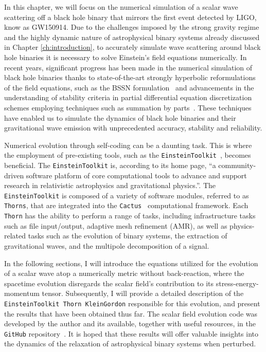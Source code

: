 In this chapter, we will focus on the numerical simulation of a scalar wave scattering off a black hole binary that mirrors the first event detected by LIGO, know as GW150914. Due to the challenges imposed by the strong gravity regime and the highly dynamic nature of astrophysical binary systems already discussed in Chapter \ref{ch:introduction}, to accurately simulate wave scattering around black hole binaries it is necessary to solve Einstein's field equations numerically. In recent years, significant progress has been made in the numerical simulation of black hole binaries thanks to state-of-the-art strongly hyperbolic reformulations of the field equations, such as the BSSN formulation~\cite{PhysRevD.52.5428,PhysRevD.59.024007} and advancements in the understanding of stability criteria in partial differential equation discretization schemes employing techniques such as summation by parts~\cite{Diener2007}. These techniques have enabled us to simulate the dynamics of black hole binaries and their gravitational wave emission with unprecedented accuracy, stability and reliability.

Numerical evolution through self-coding can be a daunting task. This is where the employment of pre-existing tools, such as the \texttt{EinsteinToolkit}~\cite{EinsteinToolkit:2022_11}, becomes beneficial. The \texttt{EinsteinToolkit} is, according to its home page, ``a community-driven software platform of core computational tools to advance and support research in relativistic astrophysics and gravitational physics.''. The \texttt{EinsteinToolkit} is composed of a variety of software modules, referred to as \texttt{Thorns}, that are integrated into the \texttt{Cactus}~\cite{Goodale:2002a} computational framework. Each \texttt{Thorn} has the ability to perform a range of tasks, including infrastructure tasks such as file input/output, adaptive mesh refinement (AMR), as well as physics-related tasks such as the evolution of binary systems, the extraction of gravitational waves, and the multipole decomposition of a signal.

In the following sections, I will introduce the equations utilized for the evolution of a scalar wave atop a numerically metric without back-reaction, where the spacetime evolution disregards the scalar field's contribution to its stress-energy-momentum tensor. Subsequently, I will provide a detailed description of the \texttt{EinsteinToolkit Thorn KleinGordon} responsible for this evolution, and present the results that have been obtained thus far. The scalar field evolution code was developed by the author and its available, together with useful resources, in the \texttt{GitHub} repository~\cite{FieldPerturbationsRepo}. It is hoped that these results will offer valuable insights into the dynamics of the relaxation of astrophysical binary systems when perturbed.